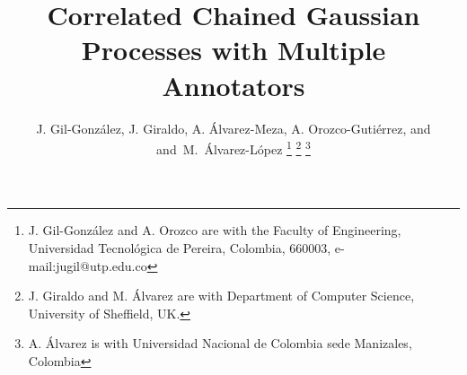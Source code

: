 \documentclass[journal]{IEEEtran}
\begin{document}
%
\title{Correlated Chained Gaussian Processes with Multiple Annotators}
%
%
%

\author{J. Gil-Gonz\'alez,
        J. Giraldo,
        A. \'Alvarez-Meza, A. Orozco-Guti\'errez, and
        and~M.~\'Alvarez-L\'opez%
\thanks{J. Gil-Gonz\'alez and A. Orozco are with the Faculty of Engineering, Universidad Tecnol\'ogica de Pereira, Colombia, 660003, e-mail:jugil@utp.edu.co}%
\thanks{J. Giraldo and M. \'Alvarez are with Department of Computer Science, University of Sheffield, UK.}%
\thanks{A. \'Alvarez is with  Universidad Nacional de Colombia sede Manizales, Colombia}}

% 
%
\end{document}
